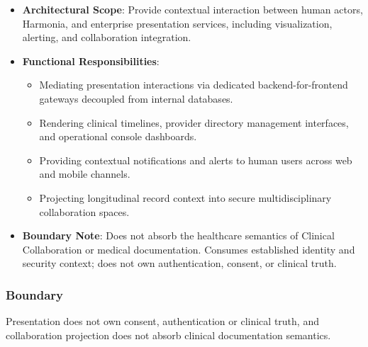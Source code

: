\begin{itemize}

\item
\textbf{Architectural Scope}: Provide contextual interaction between human actors, Harmonia, and enterprise presentation services, including visualization, alerting, and collaboration integration.



\item
\textbf{Functional Responsibilities}:


\begin{itemize}

\item
Mediating presentation interactions via dedicated backend-for-frontend gateways decoupled from internal databases.



\item
Rendering clinical timelines, provider directory management interfaces, and operational console dashboards.



\item
Providing contextual notifications and alerts to human users across web and mobile channels.



\item
Projecting longitudinal record context into secure multidisciplinary collaboration spaces.



\end{itemize}


\item
\textbf{Boundary Note}: Does not absorb the healthcare semantics of Clinical Collaboration or medical documentation. Consumes established identity and security context; does not own authentication, consent, or clinical truth.



\end{itemize}
\subsubsection*{Boundary}

Presentation does not own consent, authentication or clinical truth, and collaboration projection does not absorb clinical documentation semantics.

